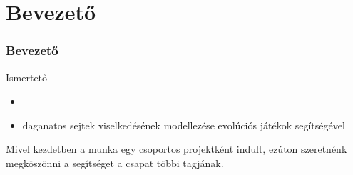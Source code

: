 \section{Bevezető}

\begin{frame}
	\frametitle{Bevezető}
	\begin{block}{Ismertető}
		\begin{itemize}
			\item 
			\item daganatos sejtek viselkedésének modellezése evolúciós játékok segítségével
		\end{itemize}
	\end{block}
	
	\begin{block}{}
		Mivel kezdetben a munka egy csoportos projektként indult, ezúton szeretnénk megköszönni a segítséget a csapat többi tagjának.
	\end{block}
\end{frame}